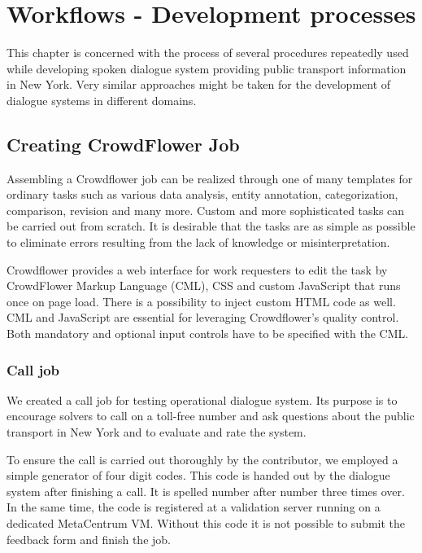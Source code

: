 \chapter{Workflows - Development processes} \label{ch:workflow}

This chapter is concerned with the process of several procedures repeatedly used while developing spoken dialogue system providing public transport information in New York.
Very similar approaches might be taken for the development of dialogue systems in different domains.


\section{Creating CrowdFlower Job}

Assembling a Crowdflower job can be realized through one of many templates for ordinary tasks such as various data analysis, entity annotation, categorization, comparison, revision and many more.%
Custom and more sophisticated tasks can be carried out from scratch.
It is desirable that the tasks are as simple as possible to eliminate errors resulting from the lack of knowledge or misinterpretation.

Crowdflower provides a web interface for work requesters to edit the task by CrowdFlower Markup Language (CML), CSS and custom JavaScript that runs once on page load.
There is a possibility to inject custom HTML code as well.
CML and JavaScript are essential for leveraging Crowdflower's quality control.
Both mandatory and optional input controls have to be specified with the CML.

\subsection{Call job}

We created a call job for testing operational dialogue system.
Its purpose is to encourage solvers to call on a toll-free number and ask questions about the public transport in New York and to evaluate and rate the system.

To ensure the call is carried out thoroughly by the contributor, we employed a simple generator of four digit codes.
This code is handed out by the dialogue system after finishing a call.
It is spelled number after number three times over.
In the same time, the code is registered at a validation server running on a dedicated MetaCentrum VM.
Without this code it is not possible to submit the feedback form and finish the job.

